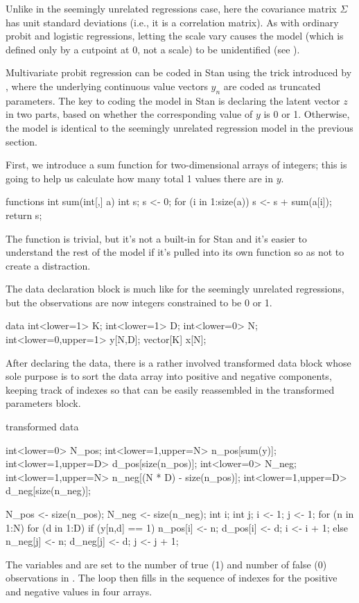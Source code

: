 Unlike in the seemingly unrelated regressions case, here the
covariance matrix $\Sigma$ has unit standard deviations (i.e., it is a
correlation matrix).  As with ordinary probit and logistic
regressions, letting the scale vary causes the model (which is defined
only by a cutpoint at 0, not a scale) to be unidentified (see
\citep{Greene:2011}).

Multivariate probit regression can be coded in Stan using the trick
introduced by \cite{AlbertChib:1993}, where the underlying continuous
value vectors $y_n$ are coded as truncated parameters.  The key to
coding the model in Stan is declaring the latent vector $z$ in two
parts, based on whether the corresponding value of $y$ is 0 or 1.
Otherwise, the model is identical to the seemingly unrelated
regression model in the previous section.

First, we introduce a sum function for two-dimensional arrays of
integers;  this is going to help us calculate how many total 1 values
there are in $y$.
%
\begin{stancode}
functions {
  int sum(int[,] a) {
    int s;
    s <- 0;
    for (i in 1:size(a))
      s <- s + sum(a[i]);
    return s;
  }
}
\end{stancode}
%
The function is trivial, but it's not a built-in for Stan and it's easier to
understand the rest of the model if it's pulled into its own function
so as not to create a distraction.

The data declaration block is much like for the seemingly unrelated
regressions, but the observations  are now integers
constrained to be 0 or 1.
%
\begin{stancode}
data {
  int<lower=1> K;
  int<lower=1> D;
  int<lower=0> N;
  int<lower=0,upper=1> y[N,D];
  vector[K] x[N];
}
\end{stancode}

After declaring the data, there is a rather involved transformed data
block whose sole purpose is to sort the data array  into
positive and negative components, keeping track of indexes so that
 can be easily reassembled in the transformed parameters
block.
%
\begin{stancode}
transformed data {
  int<lower=0> N_pos;
  int<lower=1,upper=N> n_pos[sum(y)];
  int<lower=1,upper=D> d_pos[size(n_pos)];
  int<lower=0> N_neg;
  int<lower=1,upper=N> n_neg[(N * D) - size(n_pos)];
  int<lower=1,upper=D> d_neg[size(n_neg)];

  N_pos <- size(n_pos);
  N_neg <- size(n_neg);
  {
    int i;
    int j;
    i <- 1;
    j <- 1;
    for (n in 1:N) {
      for (d in 1:D) {
        if (y[n,d] == 1) {
          n_pos[i] <- n;
          d_pos[i] <- d;
          i <- i + 1;
        } else {
          n_neg[j] <- n;
          d_neg[j] <- d;
          j <- j + 1;
        }
      }
    }
  }
}
\end{stancode}
%
The variables  and  are set to the number of
true (1) and number of false (0) observations in .  The loop
then fills in the sequence of indexes for the positive and negative
values in four arrays.


